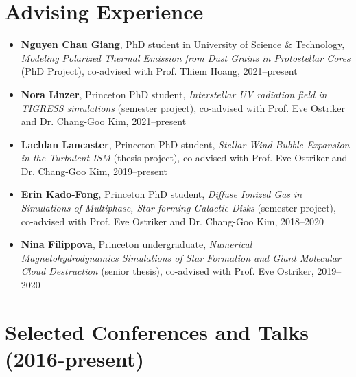 \documentclass[11pt,letterpaper,roman]{moderncv}        %
\begin{document}
\section{Advising Experience}
\begin{itemize}
\setlength\itemsep{0.0em}
\item \textbf{Nguyen Chau Giang}, PhD student in University of Science \&
  Technology, \textit{Modeling Polarized Thermal Emission from Dust Grains in
    Protostellar Cores} (PhD Project), co-advised with Prof. Thiem Hoang,
  2021--present
\item \textbf{Nora Linzer}, Princeton PhD student, \textit{Interstellar UV
    radiation field in TIGRESS simulations} (semester project), co-advised with
  Prof. Eve Ostriker and Dr. Chang-Goo Kim, 2021--present
\item \textbf{Lachlan Lancaster}, Princeton PhD student, \textit{Stellar Wind
    Bubble Expansion in the Turbulent ISM} (thesis project), co-advised with
  Prof. Eve Ostriker and Dr. Chang-Goo Kim, 2019--present
\item \textbf{Erin Kado-Fong}, Princeton PhD student, \textit{Diffuse Ionized Gas in
    Simulations of Multiphase, Star-forming Galactic Disks} (semester project),
  co-advised with Prof. Eve Ostriker and Dr. Chang-Goo Kim, 2018--2020
\item \textbf{Nina Filippova}, Princeton undergraduate, \textit{Numerical
    Magnetohydrodynamics Simulations of Star Formation and Giant Molecular Cloud
    Destruction} (senior thesis), co-advised with Prof. Eve Ostriker, 2019--2020
\end{itemize}




\section{Selected Conferences and Talks (2016-present)}
\end{document}
